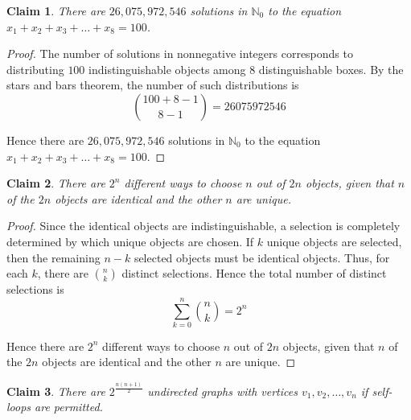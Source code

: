 \documentclass{article}
\newtheorem{claim}{Claim}
\begin{document}
\begin{claim}
    There are $26{,}075{,}972{,}546$ solutions in $\mathbb{N}_0$ to the equation $x_1 + x_2 + x_3 + 
    \dots + x_8 = 100$.
\end{claim}

\begin{proof}
    The number of solutions in nonnegative integers corresponds to distributing $100$ indistinguishable 
    objects among $8$ distinguishable boxes. By the stars and bars theorem, the number of such 
    distributions is
    \[
    \binom{100 + 8 - 1}{8 - 1} = 26075972546
    \]

    \medskip

    Hence there are $26{,}075{,}972{,}546$ solutions in $\mathbb{N}_0$ to the equation $x_1 + x_2 + x_3 + 
    \dots + x_8 = 100$.
\end{proof}

\begin{claim}
    There are $2^n$ different ways to choose $n$ out of $2n$ objects, given that $n$ of the $2n$ objects 
    are identical and the other $n$ are unique.
\end{claim}

\begin{proof}
    Since the identical objects are indistinguishable, a selection is completely determined by which unique 
    objects are chosen. If $k$ unique objects are selected, then the remaining $n - k$ selected objects must 
    be identical objects. Thus, for each $k$, there are $\binom{n}{k}$ distinct selections. Hence the total 
    number of distinct selections is
    \[
    \sum_{k=0}^{n}\binom{n}{k} = 2^n
    \]

    \medskip

    Hence there are $2^n$ different ways to choose $n$ out of $2n$ objects, given that $n$ of the $2n$ 
    objects are identical and the other $n$ are unique.
\end{proof}

\begin{claim}
    There are $2^{\frac{n(n+1)}{2}}$ undirected graphs with vertices $v_1, v_2, \dots, v_n$ if self-loops 
    are permitted.
\end{claim}
\end{document}
